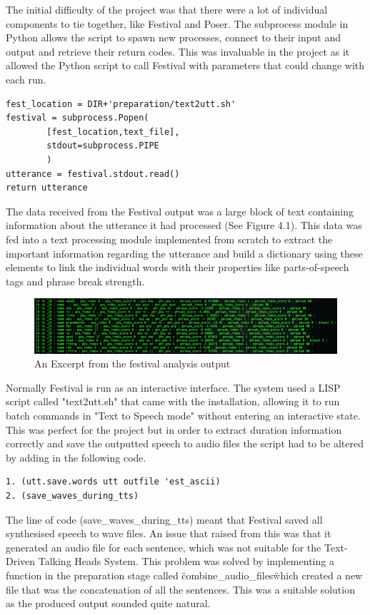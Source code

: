 \documentclass[bsc,frontabs,twoside,singlespacing,parskip]{infthesis}
\begin{document}
The initial difficulty of the project was that there were a lot of individual components to tie together, like Festival and Poser. The subprocess module in Python allows the script to spawn new processes, connect to their input and output and retrieve their return codes. This was invaluable in the project as it allowed the Python script to call Festival with parameters that could change with each run.

\begin{lstlisting}
fest_location = DIR+'preparation/text2utt.sh'
festival = subprocess.Popen(
		[fest_location,text_file], 
		stdout=subprocess.PIPE
		)
utterance = festival.stdout.read()
return utterance
\end{lstlisting}

The data received from the Festival output was a large block of text containing information about the utterance it had processed (See Figure 4.1). This data was fed into a text processing module implemented from scratch to extract the important information regarding the utterance and build a dictionary using these elements to link the individual words with their properties like parts-of-speech tags and phrase break strength.

\begin{figure}
	\includegraphics[width=1.0\textwidth]{festival_output.png}
	\caption{An Excerpt from the festival analysis output}
\end{figure}

Normally Festival is run as an interactive interface. The system used a LISP script called "text2utt.sh" that came with the installation, allowing it to run batch commands in "Text to Speech mode" without entering an interactive state. This was perfect for the project but in order to extract duration information correctly and save the outputted speech to audio files the script had to be altered by adding in the following code. 

\begin{lstlisting}
1. (utt.save.words utt outfile 'est_ascii) 
2. (save_waves_during_tts)
\end{lstlisting}

The line of code (save\_waves\_during\_tts) meant that Festival saved all synthesised speech to wave files. An issue that raised from this was that it generated an audio file for each sentence, which was not suitable for the Text-Driven Talking Heads System. This problem was solved by implementing a function in the preparation stage called \"combine\_audio\_files\" which created a new file that was the concatenation of all the sentences. This was a suitable solution as the produced output sounded quite natural.
\end{document}

